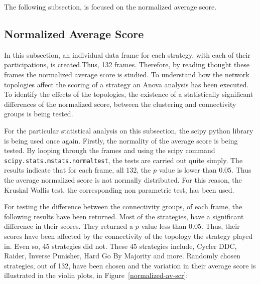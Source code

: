 The following subsection, is focused on the normalized average score.

\subsection{Normalized Average Score}

In this subsection, an individual data frame for each strategy, with each of
their participations, is created.Thus, 132 frames. Therefore, by reading thought
these frames
the normalized average score is studied. To understand how the network topologies
affect the scoring of a strategy an Anova analysis has been executed.
To identify the effects of the topologies, the existence of a
statistically significant differences of the normalized score, between the
clustering and connectivity groups is being tested.

For the particular statistical analysis on this subsection, the scipy
python library is being used once again. Firstly, the normality of the average
score is being tested. By looping through the frames and using the scipy
command \texttt{scipy.stats.mstats.normaltest}, the tests are carried out quite simply.
The results indicate that for
each frame, all 132, the \(p\) value is lower than 0.05. Thus the average normalized
score is not normally distributed. For this reason, the Kruskal Wallis test, the
corresponding non parametric test, has been used.

For testing the difference between the connectivity groups, of each frame,
the following results have been returned. Most of the strategies, have a significant
difference in their scores. They returned a \(p\) value less than 0.05.
Thus, their scores have been affected by the connectivity  of the topology the
strategy played in. Even so, 45 strategies did not. These 45 strategies include,
Cycler DDC, Raider, Inverse Punisher, Hard Go By Majority and more. Randomly
chosen strategies, out of 132, have been chosen and the variation in their average
score is illustrated in the violin plots, in Figure~\ref{normalized-av-scr}:

